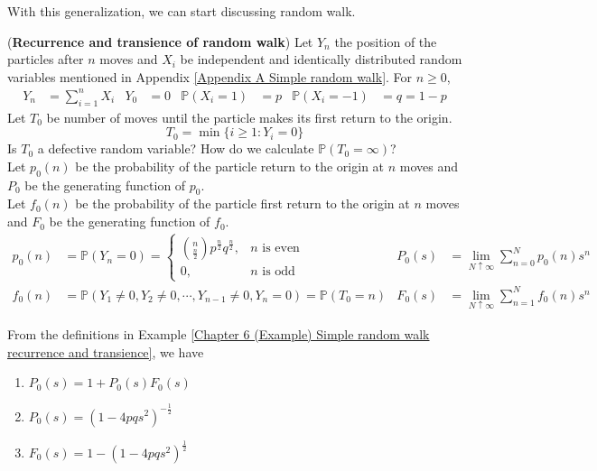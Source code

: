 \documentclass{huhtakm-template-book}
\newcommand{\prob}{\mathbb{P}}
\begin{document}
\newpage
With this generalization, we can start discussing random walk.
\begin{eg}(\textbf{Recurrence and transience of random walk})
	\label{Chapter 6 (Example) Simple random walk recurrence and transience}
	Let $Y_{n}$ the position of the particles after $n$ moves and $X_{i}$ be independent and identically distributed random variables mentioned in Appendix \ref{Appendix A Simple random walk}. For $n\geq 0$,
	\begin{align*}
		Y_{n}&=\sum_{i=1}^{n}X_{i} & Y_{0}&=0 & \prob(X_{i}=1)&=p & \prob(X_{i}=-1)&=q=1-p
	\end{align*}
	Let $T_{0}$ be number of moves until the particle makes its first return to the origin.
	\begin{equation*}
		T_{0}=\min\{i\geq 1:Y_{i}=0\}
	\end{equation*}
	Is $T_{0}$ a defective random variable? How do we calculate $\prob(T_{0}=\infty)$?\\
	Let $p_{0}(n)$ be the probability of the particle return to the origin at $n$ moves and $P_{0}$ be the generating function of $p_{0}$.\\
	Let $f_{0}(n)$ be the probability of the particle first return to the origin at $n$ moves and $F_{0}$ be the generating function of $f_{0}$.
	\begin{align*}
		p_{0}(n)&=\prob(Y_{n}=0)=\begin{cases}
			\binom{n}{\frac{n}{2}}p^{\frac{n}{2}}q^{\frac{n}{2}}, &n\text{ is even}\\
			0, &n\text{ is odd}
		\end{cases} & P_{0}(s)&=\lim_{N\uparrow\infty}\sum_{n=0}^{N}p_{0}(n)s^{n}\\
		f_{0}(n)&=\prob(Y_{1}\neq 0,Y_{2}\neq 0,\cdots,Y_{n-1}\neq 0,Y_{n}=0)=\prob(T_{0}=n) & F_{0}(s)&=\lim_{N\uparrow\infty}\sum_{n=1}^{N}f_{0}(n)s^{n}
	\end{align*}
\end{eg}
\begin{thm}
	\label{Chapter 6 (Theorem) Simple random walk particle return generating function}
	From the definitions in Example \ref{Chapter 6 (Example) Simple random walk recurrence and transience}, we have
	\begin{enumerate}
		\item $P_{0}(s)=1+P_{0}(s)F_{0}(s)$
		\item $P_{0}(s)=(1-4pqs^{2})^{-\frac{1}{2}}$
		\item $F_{0}(s)=1-(1-4pqs^{2})^{\frac{1}{2}}$
	\end{enumerate}
\end{thm}
\end{document}
